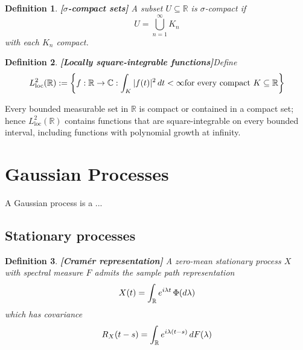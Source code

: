 \documentclass{article}
\newcommand{\assign}{:=}
\newcommand{\textdots}{...}
\newcommand{\tmop}[1]{\ensuremath{\operatorname{#1}}}
\newcommand{\tmstrong}[1]{\textbf{#1}}
\newtheorem{definition}{Definition}
\begin{document}
\begin{definition}
  {\tmstrong{[$\sigma$-compact sets]\label{def:sigma_compact}}} A subset $U
  \subseteq \mathbb{R}$ is $\sigma$-compact if
  \begin{equation}
    U = \bigcup_{n = 1}^{\infty} K_n
  \end{equation}
  with each $K_n$ compact.
\end{definition}

\begin{definition}
  {\tmstrong{[Locally square-integrable functions]}}\label{def:L2loc} Define
  \begin{equation}
    L^2_{\tmop{loc}} (\mathbb{R}) \assign \left\{ f : \mathbb{R} \to
    \mathbb{C}: \int_K |f (t) |^2  \hspace{0.17em} dt < \infty \text{for every
    compact } K \subseteq \mathbb{R} \right\}
  \end{equation}
\end{definition}

\begin{remark}
  Every bounded measurable set in $\mathbb{R}$ is compact or contained in a
  compact set; hence $L^2_{\tmop{loc}} (\mathbb{R})$ contains functions that
  are square-integrable on every bounded interval, including functions with
  polynomial growth at infinity.
\end{remark}

\section{Gaussian Processes}

A Gaussian process is a {\textdots}

\subsection{Stationary processes}

\begin{definition}
  {\tmstrong{[Cram{\'e}r representation]\label{def:cramer}}} A zero-mean
  stationary process $X$ with spectral measure $F$ admits the sample path
  representation
  \begin{equation}
    X (t) = \int_{\mathbb{R}} e^{i \lambda t}  \hspace{0.17em} \Phi (d
    \lambda)
  \end{equation}
  which has covariance
  \begin{equation}
    R_X  (t - s) = \int_{\mathbb{R}} e^{i \lambda (t - s)}  \hspace{0.17em} dF
    (\lambda)
  \end{equation}
\end{definition}
\end{document}

